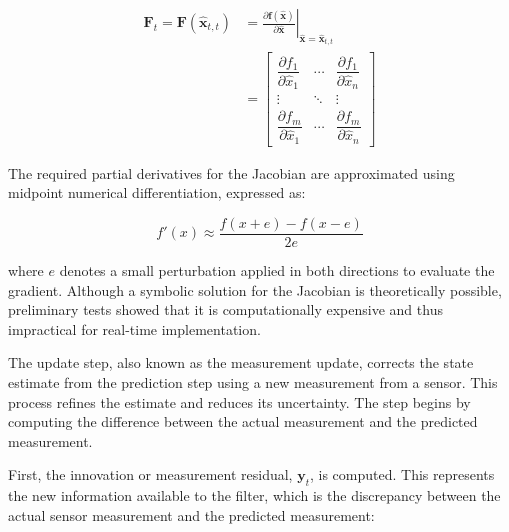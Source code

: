\begin{equation}
  \begin{aligned}
    \mathbf{F}_t = \mathbf{F}(\mathbf{\hat{x}}_{t,t})
     &= \left. \frac{\partial \mathbf{f}(\mathbf{\hat{x}})}{\partial \mathbf{\hat{x}}} \right|_{\mathbf{\hat{x}} = \mathbf{\hat{x}}_{t,t}} \\
     &=
    \begin{bmatrix}
      \dfrac{\partial f_1}{\partial \hat{x}_1} & \cdots & \dfrac{\partial f_1}{\partial \hat{x}_n} \\
      \vdots & \ddots & \vdots \\
      \dfrac{\partial f_m}{\partial \hat{x}_1} & \cdots & \dfrac{\partial f_m}{\partial \hat{x}_n}
    \end{bmatrix}
  \end{aligned}
\end{equation}
\vspace{0.5cm}

\noindent
The required partial derivatives for the Jacobian are approximated using midpoint numerical differentiation, expressed as:

\begin{equation}
f'(x) \approx \frac{f(x+e)-f(x-e)}{2e}
\end{equation}

\noindent
where $e$ denotes a small perturbation applied in both directions to evaluate the gradient. Although a symbolic solution for the Jacobian is theoretically possible, 
preliminary tests showed that it is computationally expensive and thus impractical for real-time implementation.

\label{sec:Update}

The update step, also known as the measurement update, corrects the state estimate from the prediction step using a new measurement from a sensor. This process 
refines the estimate and reduces its uncertainty. The step begins by computing the difference between the actual measurement and the predicted measurement.
\vspace{0.5cm}

\noindent
First, the innovation or measurement residual, $\mathbf{y}_t$, is computed. This represents the new information available to the filter, which is the discrepancy between the actual 
sensor measurement and the predicted measurement:

